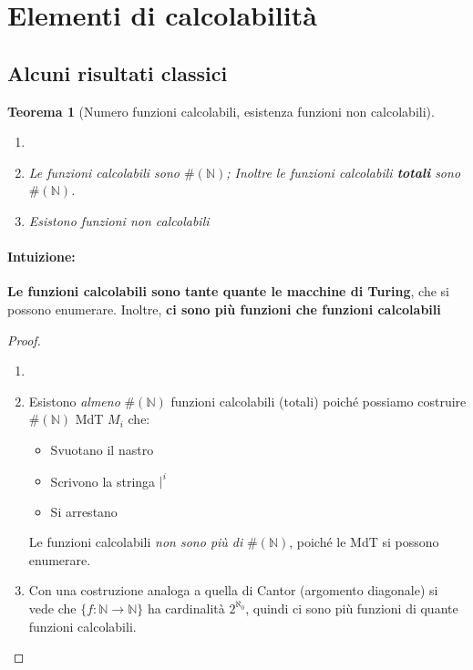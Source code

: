\documentclass[a4paper,10pt,oneside]{article}
\theoremstyle{break}
\newtheorem{teo}{Teorema}[subsection]
\newcommand{\naturals}{\mathbb {N}}
\begin{document}
\section{Elementi di calcolabilità}
\subsection{Alcuni risultati classici}
\begin{mdframed}
\begin{teo} [Numero funzioni calcolabili, esistenza funzioni non calcolabili]
\begin{enumerate}
 \item []
 \item Le funzioni calcolabili sono $\#(\naturals)$; Inoltre le funzioni calcolabili \textbf{totali} sono $\#(\naturals)$.
 \item Esistono funzioni non calcolabili
\end{enumerate}
\end{teo}

\dotfill

\paragraph{Intuizione:} \textbf{Le funzioni calcolabili sono tante quante le macchine di Turing}, che si possono enumerare. Inoltre, \textbf{ci sono più funzioni che funzioni calcolabili}

\dotfill

\begin{proof}
\begin{enumerate}
 \item []
 \item Esistono \emph{almeno} $\#(\naturals)$ funzioni calcolabili (totali) poiché possiamo costruire $\#(\naturals)$ MdT $M_i$ che:
 \begin{itemize}
  \item Svuotano il nastro
  \item Scrivono la stringa $|^i$
  \item Si arrestano
 \end{itemize}
 Le funzioni calcolabili \emph{non sono più di} $\#(\naturals)$, poiché le MdT si possono enumerare.
 \item Con una costruzione analoga a quella di Cantor (argomento diagonale) si vede che $\{f : \naturals \to \naturals\}$ ha cardinalità $2^{\aleph_0}$, quindi ci sono più funzioni di quante funzioni calcolabili.
\end{enumerate}
\end{proof}
\end{mdframed}
\end{document}
